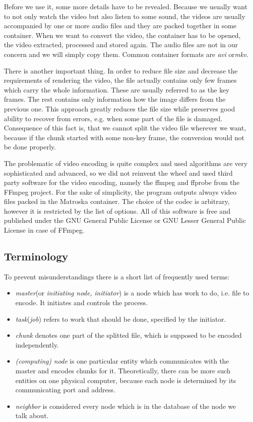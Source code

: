 Before we use it, some more details have to be revealed. Because we usually want to not only watch the video but also listen to some sound, the videos are usually accompanied by one or more audio files and they are packed together in some container. When we want to convert the video, the container has to be opened, the video extracted, processed and stored again. The audio files are not in our concern and we will simply copy them. Common container formats are \textit{avi} or\textit{mkv}.

There is another important thing. In order to reduce file size and decrease the requirements of rendering the video, the file actually contains only few frames which carry the whole information. These are usually referred to as the key frames. The rest contains only information how the image differs from the previous one. This approach greatly reduces the file size while preserves good ability to recover from errors, e.g. when some part of the file is damaged. Consequence of this fact is, that we cannot split the video file wherever we want, because if the chunk started with some non-key frame, the conversion would not be done properly.

The problematic of video encoding is quite complex and used algorithms are very sophisticated and advanced, so we did not reinvent the wheel and used third party software for the video encoding, namely the ffmpeg and ffprobe from the FFmpeg project. For the sake of simplicity, the program outputs always video files packed in the Matroska container. The choice of the codec is arbitrary, however it is restricted by the list of options. All of this software is free and published under the GNU General Public License or GNU Lesser General Public License in case of FFmpeg.

\subsection*{Terminology}
To prevent misunderstandings there is a short list of frequently used terms:
\begin{itemize}
\item \textit{master}(or \textit{initiating node, initiator}) is a node which has work to do, i.e. file to encode. It initiates and controls the process.
\item \textit{task}(\textit{job}) refers to work that should be done, specified by the initiator.
\item \textit{chunk} denotes one part of the splitted file, which is supposed to be encoded independently.
\item \textit{(computing) node} is one particular entity which communicates with the master and encodes chunks for it. Theoretically, there can be more such entities on one physical computer, because each node is determined by its communicating port and address.
\item \textit{neighbor} is considered every node which is in the database of the node we talk about.
\end{itemize}

